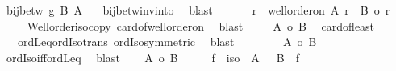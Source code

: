 \begin{isabellebody}
\ {\isachardoublequoteopen}bij{\isacharunderscore}{\kern0pt}betw\ {\isacharquery}{\kern0pt}g\ B\ A{\isachardoublequoteclose}\ \isamarkupfalse%
\ {\isacharasterisk}{\kern0pt}\ bij{\isacharunderscore}{\kern0pt}betw{\isacharunderscore}{\kern0pt}inv{\isacharunderscore}{\kern0pt}into\ \isamarkupfalse%
\ blast\isanewline
\ \ \ \isamarkupfalse%
\ \isamarkupfalse%
\ r\ \ {\isachardoublequoteopen}well{\isacharunderscore}{\kern0pt}order{\isacharunderscore}{\kern0pt}on\ A\ r\ {\isasymand}\ {\isacharbar}{\kern0pt}B{\isacharbar}{\kern0pt}\ {\isacharequal}{\kern0pt}o\ r{\isachardoublequoteclose}\isanewline
\ \ \ \isamarkupfalse%
\ Well{\isacharunderscore}{\kern0pt}order{\isacharunderscore}{\kern0pt}iso{\isacharunderscore}{\kern0pt}copy\ card{\isacharunderscore}{\kern0pt}of{\isacharunderscore}{\kern0pt}well{\isacharunderscore}{\kern0pt}order{\isacharunderscore}{\kern0pt}on\ \isamarkupfalse%
\ blast\isanewline
\ \ \ \isamarkupfalse%
\ {\isachardoublequoteopen}{\isacharbar}{\kern0pt}A{\isacharbar}{\kern0pt}\ {\isasymle}o\ {\isacharbar}{\kern0pt}B{\isacharbar}{\kern0pt}{\isachardoublequoteclose}\ \isamarkupfalse%
\ card{\isacharunderscore}{\kern0pt}of{\isacharunderscore}{\kern0pt}least\isanewline
\ \ \ ordLeq{\isacharunderscore}{\kern0pt}ordIso{\isacharunderscore}{\kern0pt}trans\ ordIso{\isacharunderscore}{\kern0pt}symmetric\ \isamarkupfalse%
\ blast\isanewline
\ \ \isacommand{{\isacharbraceright}{\kern0pt}}\isamarkupfalse%
\isanewline
\ \ \isamarkupfalse%
\ \isamarkupfalse%
\ {\isachardoublequoteopen}{\isacharbar}{\kern0pt}A{\isacharbar}{\kern0pt}\ {\isacharequal}{\kern0pt}o\ {\isacharbar}{\kern0pt}B{\isacharbar}{\kern0pt}{\isachardoublequoteclose}\ \isamarkupfalse%
\ ordIso{\isacharunderscore}{\kern0pt}iff{\isacharunderscore}{\kern0pt}ordLeq\ \isamarkupfalse%
\ blast\isanewline
{}\isamarkupfalse%
\isanewline
\ \ \isamarkupfalse%
\ {\isachardoublequoteopen}{\isacharbar}{\kern0pt}A{\isacharbar}{\kern0pt}\ {\isacharequal}{\kern0pt}o\ {\isacharbar}{\kern0pt}B{\isacharbar}{\kern0pt}{\isachardoublequoteclose}\isanewline
\ \ \isamarkupfalse%
\ \isamarkupfalse%
\ f\ \ {\isachardoublequoteopen}iso\ {\isacharparenleft}{\kern0pt}\ {\isacharbar}{\kern0pt}A{\isacharbar}{\kern0pt}\ {\isacharparenright}{\kern0pt}\ {\isacharparenleft}{\kern0pt}\ {\isacharbar}{\kern0pt}B{\isacharbar}{\kern0pt}\ {\isacharparenright}{\kern0pt}\ f{\isachardoublequoteclose}\isanewline

\end{isabellebody}
